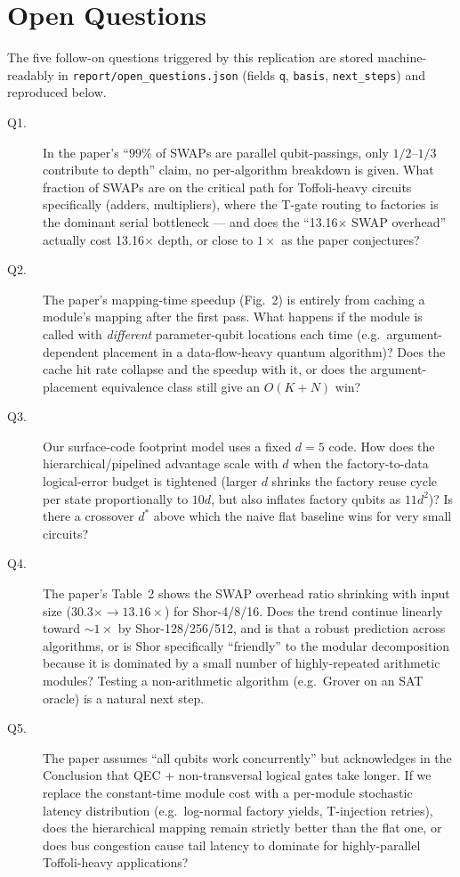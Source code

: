 \documentclass[11pt]{article}
\begin{document}


\section{Open Questions}

The five follow-on questions triggered by this replication are stored
machine-readably in \texttt{report/open\_questions.json}
(fields \texttt{q}, \texttt{basis}, \texttt{next\_steps}) and reproduced
below.

\begin{description}
  \item[Q1.] In the paper's ``$99\%$ of SWAPs are parallel qubit-passings,
    only $1/2\text{--}1/3$ contribute to depth'' claim, no per-algorithm
    breakdown is given.  What fraction of SWAPs are on the critical path for
    Toffoli-heavy circuits specifically (adders, multipliers), where the T-gate
    routing to factories is the dominant serial bottleneck --- and does the
    ``13.16$\times$ SWAP overhead'' actually cost 13.16$\times$ depth, or
    close to $1\times$ as the paper conjectures?
  \item[Q2.] The paper's mapping-time speedup (Fig.~2) is entirely from
    caching a module's mapping after the first pass.  What happens if the
    module is called with \emph{different} parameter-qubit locations each
    time (e.g.\ argument-dependent placement in a data-flow-heavy quantum
    algorithm)?  Does the cache hit rate collapse and the speedup with it,
    or does the argument-placement equivalence class still give an $O(K+N)$
    win?
  \item[Q3.] Our surface-code footprint model uses a fixed $d=5$ code.  How
    does the hierarchical/pipelined advantage scale with $d$ when the
    factory-to-data logical-error budget is tightened
    (larger $d$ shrinks the factory reuse cycle per state proportionally to
    $10d$, but also inflates factory qubits as $11d^2$)?  Is there a crossover
    $d^*$ above which the naive flat baseline wins for very small circuits?
  \item[Q4.] The paper's Table~2 shows the SWAP overhead ratio shrinking
    with input size ($30.3\times \to 13.16\times$) for Shor-4/8/16.  Does the
    trend continue linearly toward $\sim 1\times$ by Shor-128/256/512, and is
    that a robust prediction across algorithms, or is Shor specifically
    ``friendly'' to the modular decomposition because it is dominated by a
    small number of highly-repeated arithmetic modules?  Testing a
    non-arithmetic algorithm (e.g.\ Grover on an SAT oracle) is a natural
    next step.
  \item[Q5.] The paper assumes ``all qubits work concurrently'' but
    acknowledges in the Conclusion that QEC + non-transversal logical gates
    take longer.  If we replace the constant-time module cost with a
    per-module stochastic latency distribution (e.g.\ log-normal factory
    yields, T-injection retries), does the hierarchical mapping remain
    strictly better than the flat one, or does bus congestion cause tail
    latency to dominate for highly-parallel Toffoli-heavy applications?
\end{description}
\end{document}
